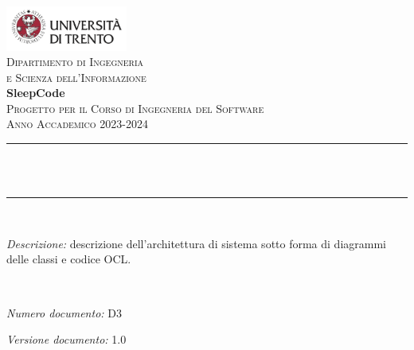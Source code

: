 \begin{titlepage}
    \newcommand{\HRule}{\rule{\linewidth}{0.3mm}} %
    \center %
    
    \includegraphics[width=0.3\textwidth]{materiale/elementi-copertina/UniTrento_logo_ITA_colore.png}\\[0.5cm]
    \textsc{\Large Dipartimento di Ingegneria\\e Scienza dell'Informazione}\\[1.5cm]
    
    {\Huge\textbf{SleepCode}}\\[0.5cm]
    \textsc{\large Progetto per il Corso di Ingegneria del Software}\\
    \textsc{\large Anno Accademico 2023-2024}\\[0.5cm]
    
    
    \HRule\\[0.4cm]
    {\huge\bfseries \@title}\\[0.1cm]
    \HRule\\[1cm]
    
    \begin{minipage}{\textwidth}
    \textit{Descrizione:} descrizione dell'architettura di sistema sotto forma di diagrammi delle classi e codice OCL.
    \end{minipage}\\[1.5cm]
    
    
    \begin{minipage}{0.4\textwidth}
    \begin{flushleft}
    \large
    \textit{Numero documento:} D3
    \end{flushleft}
    \end{minipage}
    \begin{minipage}{0.4\textwidth}
    \begin{flushright}
    \large
    \textit{Versione documento:} 1.0
    \end{flushright}
    \end{minipage}\\[1.5cm]
    

\end{titlepage}

